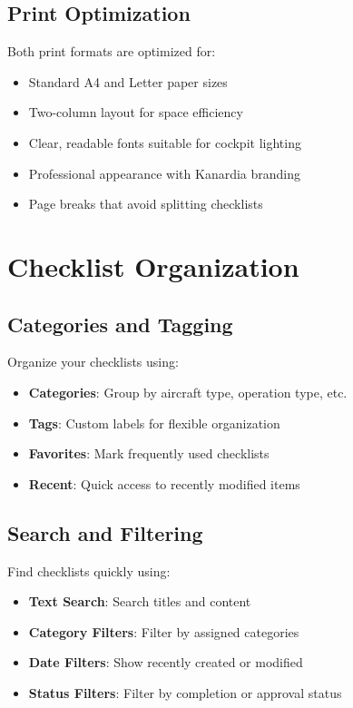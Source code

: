 \subsection{Print Optimization}

Both print formats are optimized for:
\begin{itemize}
    \item Standard A4 and Letter paper sizes
    \item Two-column layout for space efficiency
    \item Clear, readable fonts suitable for cockpit lighting
    \item Professional appearance with Kanardia branding
    \item Page breaks that avoid splitting checklists
\end{itemize}

\section{Checklist Organization}

\subsection{Categories and Tagging}

Organize your checklists using:

\begin{itemize}
    \item \textbf{Categories}: Group by aircraft type, operation type, etc.
    \item \textbf{Tags}: Custom labels for flexible organization
    \item \textbf{Favorites}: Mark frequently used checklists
    \item \textbf{Recent}: Quick access to recently modified items
\end{itemize}

\subsection{Search and Filtering}

Find checklists quickly using:

\begin{itemize}
    \item \textbf{Text Search}: Search titles and content
    \item \textbf{Category Filters}: Filter by assigned categories
    \item \textbf{Date Filters}: Show recently created or modified
    \item \textbf{Status Filters}: Filter by completion or approval status
\end{itemize}

